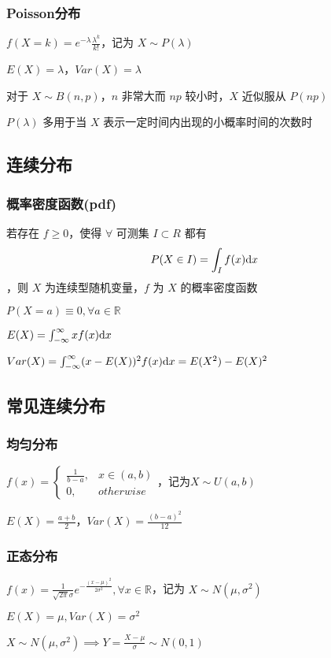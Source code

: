 \documentclass[./main.tex]{subfiles}
\begin{document}
\subsubsection{Poisson分布}
\begin{itemize*}
    \item $f(X=k)=e^{-\lambda}\frac{\lambda^k}{k!}$，记为 $X\sim P(\lambda)$
    \item $E(X)=\lambda$，$Var(X)=\lambda$
    \item 对于 $X\sim B(n,p)$，$n$ 非常大而 $np$ 较小时，$X$ 近似服从 $P(np)$
    \item $P(\lambda)$ 多用于当 $X$ 表示一定时间内出现的小概率时间的次数时
\end{itemize*}
\subsection{连续分布}
\subsubsection{概率密度函数(pdf)}
若存在 $f\ge 0$，使得 $\forall$ 可测集 $I\subset R$ 都有
$$P(X\in I)=\int_If(x)\text{d}x$$，则 $X$ 为连续型随机变量，$f$ 为 $X$ 的概率密度函数
\begin{enumerate*}
    \item $P(X=a)\equiv 0, \forall a\in\mathbb{R}$
    \item $E(X)=\int_{-\infty}^{\infty}xf(x)\text{d}x$
    \item $Var(X)=\int_{-\infty}^{\infty}(x-E(X))^2f(x)\text{d}x=E(X^2)-E(X)^2$
\end{enumerate*}
\subsection{常见连续分布}
\subsubsection{均匀分布}
\begin{itemize*}
    \item $f(x)=\begin{cases}\frac{1}{b-a},&x\in(a,b)\\0,&otherwise\end{cases}$，记为$X\sim U(a,b)$
    \item $E(X)=\frac{a+b}{2}$，$Var(X)=\frac{(b-a)^2}{12}$
\end{itemize*}
\subsubsection{正态分布}
\begin{itemize*}
    \item $f(x)=\frac{1}{\sqrt{2\pi}\sigma}e^{-\frac{(x-\mu)^2}{2\sigma^2}},\forall x\in\mathbb{R}$，记为 $X\sim N(\mu,\sigma^2)$
    \item $E(X)=\mu,Var(X)=\sigma^2$
    \item $X\sim N(\mu,\sigma^2)\implies Y=\frac{X-\mu}{\sigma}\sim N(0,1)$
\end{itemize*}
\end{document}
